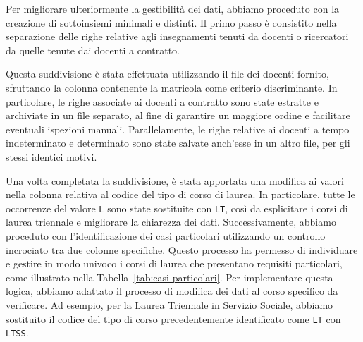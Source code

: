 Per migliorare ulteriormente la gestibilità dei dati, abbiamo proceduto con la creazione 
di sottoinsiemi minimali e distinti. Il primo passo è consistito nella separazione delle 
righe relative agli insegnamenti tenuti da docenti o ricercatori da quelle tenute dai 
docenti a contratto.

Questa suddivisione è stata effettuata utilizzando il file dei docenti fornito, 
sfruttando la colonna contenente la matricola come criterio discriminante. In particolare, 
le righe associate ai docenti a contratto sono state estratte e archiviate in un file separato, 
al fine di garantire un maggiore ordine e facilitare eventuali ispezioni manuali. 
Parallelamente, le righe relative ai docenti a tempo indeterminato e determinato sono 
state salvate anch'esse in un altro file, per gli stessi identici motivi.

Una volta completata la suddivisione, è stata apportata una modifica ai valori nella colonna 
relativa al codice del tipo di corso di laurea. In particolare, tutte le occorrenze del 
valore \texttt{L} sono state sostituite con \texttt{LT}, così da esplicitare i corsi di 
laurea triennale e migliorare la chiarezza dei dati. Successivamente, abbiamo proceduto con 
l'identificazione dei casi particolari utilizzando un controllo incrociato tra due colonne 
specifiche. Questo processo ha permesso di individuare e gestire in modo univoco i corsi 
di laurea che presentano requisiti particolari, come illustrato nella 
Tabella~\ref{tab:casi-particolari}.
Per implementare questa logica, abbiamo adattato il processo di modifica dei dati al corso 
specifico da verificare. Ad esempio, per la Laurea Triennale in Servizio Sociale, abbiamo 
sostituito il codice del tipo di corso precedentemente identificato come \texttt{LT} con 
\texttt{LTSS}.


